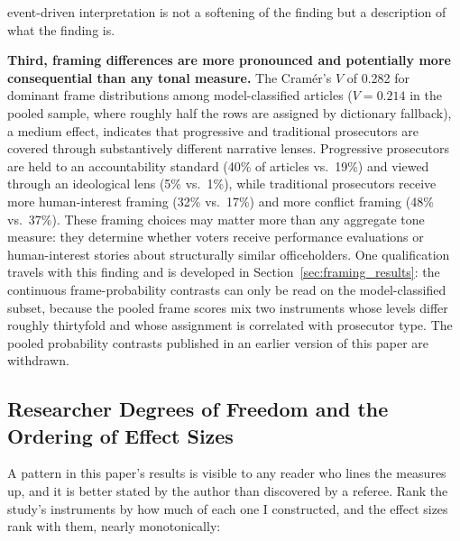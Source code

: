 \documentclass[12pt, letterpaper]{article}
\begin{document}
event-driven interpretation is not a softening of the finding but a description of what the finding is.

\textbf{Third, framing differences are more pronounced and potentially more consequential than any tonal measure.} The Cram\'{e}r's $V$ of 0.282 for dominant frame distributions among model-classified articles ($V = 0.214$ in the pooled sample, where roughly half the rows are assigned by dictionary fallback), a medium effect, indicates that progressive and traditional prosecutors are covered through substantively different narrative lenses. Progressive prosecutors are held to an accountability standard (40\% of articles vs.\ 19\%) and viewed through an ideological lens (5\% vs.\ 1\%), while traditional prosecutors receive more human-interest framing (32\% vs.\ 17\%) and more conflict framing (48\% vs.\ 37\%). These framing choices may matter more than any aggregate tone measure: they determine whether voters receive performance evaluations or human-interest stories about structurally similar officeholders. One qualification travels with this finding and is developed in Section~\ref{sec:framing_results}: the continuous frame-probability contrasts can only be read on the model-classified subset, because the pooled frame scores mix two instruments whose levels differ roughly thirtyfold and whose assignment is correlated with prosecutor type. The pooled probability contrasts published in an earlier version of this paper are withdrawn.

\subsection{Researcher Degrees of Freedom and the Ordering of Effect Sizes}
\label{sec:dof}

A pattern in this paper's results is visible to any reader who lines the measures up, and it is better stated by the author than discovered by a referee. Rank the study's instruments by how much of each one I constructed, and the effect sizes rank with them, nearly monotonically:
\end{document}
